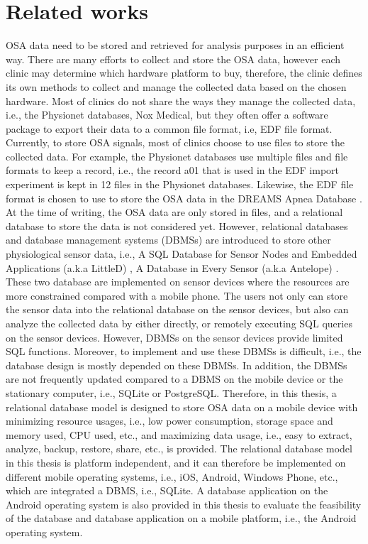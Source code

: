 \section{Related works}
OSA data need to be stored and retrieved for analysis purposes in an efficient way. There are many efforts to collect and store the OSA data, however each clinic may determine which hardware platform to buy, therefore, the clinic defines its own methods to collect and manage the collected data based on the chosen hardware. Most of clinics do not share the ways they manage the collected data, i.e., the Physionet databases, Nox Medical, but they often offer a software package to export their data to a common file format, i.e, EDF file format. Currently, to store OSA signals, most of clinics choose to use files to store the collected data. For example, the Physionet databases use multiple files and file formats to keep a record, i.e., the record a01 that is used in the EDF import experiment is kept in 12 files in the Physionet databases. Likewise, the EDF file format is chosen to use to store the OSA data in the DREAMS Apnea Database \citep{tcts}. At the time of writing, the OSA data are only stored in files, and a relational database to store the data is not considered yet. However, relational databases and database management systems (DBMSs) are introduced to store other physiological sensor data, i.e., A SQL Database for Sensor Nodes and Embedded Applications (a.k.a LittleD) \citep{LittleD}, A Database in Every Sensor (a.k.a Antelope) \citep{Nicolas}. These two database are implemented on sensor devices where the resources are more constrained compared with a mobile phone. The users not only can store the sensor data into the relational database on the sensor devices, but also can analyze the collected data by either directly, or remotely executing SQL queries on the sensor devices. However, DBMSs on the sensor devices provide limited SQL functions. Moreover, to implement and use these DBMSs is difficult, i.e., the database design is mostly depended on these DBMSs. In addition, the DBMSs are not frequently updated compared to a DBMS on the mobile device or the stationary computer, i.e., SQLite or PostgreSQL. Therefore, in this thesis, a relational database model is designed to store OSA data on a mobile device with minimizing resource usages, i.e., low power consumption, storage space and memory used, CPU used, etc., and maximizing data usage, i.e., easy to extract, analyze, backup, restore, share, etc., is provided. The relational database model in this thesis is platform independent, and it can therefore be implemented on different mobile operating systems, i.e., iOS, Android, Windows Phone, etc., which are integrated a DBMS, i.e., SQLite. A database application on the Android operating system is also provided in this thesis to evaluate the feasibility of the database and database application on a mobile platform, i.e., the Android operating system.
